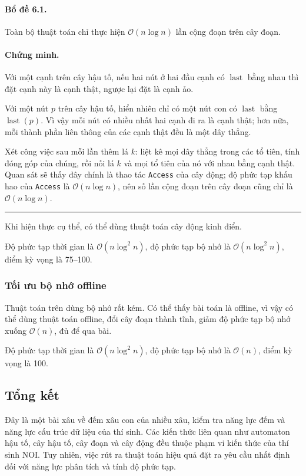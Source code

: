 \documentclass[11pt]{article}
\newcommand{\Oh}{\mathcal{O}}
\newcommand{\qedmark}{\hfill\rule{0.7ex}{0.7ex}}
\begin{document}
\paragraph{Bổ đề 6.1.}
Toàn bộ thuật toán chỉ thực hiện \(\Oh(n\log n)\) lần cộng đoạn trên cây đoạn.

\paragraph{Chứng minh.}
Với một cạnh trên cây hậu tố, nếu hai nút ở hai đầu cạnh có
\(\operatorname{last}\) bằng nhau thì đặt cạnh này là cạnh thật, ngược lại đặt
là cạnh ảo.

Với một nút \(p\) trên cây hậu tố, hiển nhiên chỉ có một nút con có
\(\operatorname{last}\) bằng \(\operatorname{last}(p)\). Vì vậy mỗi nút có nhiều
nhất hai cạnh đi ra là cạnh thật; hơn nữa, mỗi thành phần liên thông của các
cạnh thật đều là một dây thẳng.

Xét công việc sau mỗi lần thêm lá \(k\): liệt kê mọi dây thẳng trong các tổ
tiên, tính đóng góp của chúng, rồi nối lá \(k\) và mọi tổ tiên của nó với nhau
bằng cạnh thật. Quan sát sẽ thấy đây chính là thao tác \texttt{Access} của cây
động; độ phức tạp khấu hao của \texttt{Access} là \(\Oh(n\log n)\), nên số lần
cộng đoạn trên cây đoạn cũng chỉ là \(\Oh(n\log n)\). \qedmark

Khi hiện thực cụ thể, có thể dùng thuật toán cây động kinh điển.

Độ phức tạp thời gian là \(\Oh(n\log^2 n)\), độ phức tạp bộ nhớ là
\(\Oh(n\log^2 n)\), điểm kỳ vọng là 75--100.

\subsubsection{Tối ưu bộ nhớ offline}

Thuật toán trên dùng bộ nhớ rất kém. Có thể thấy bài toán là offline, vì vậy
có thể dùng thuật toán offline, đổi cây đoạn thành tĩnh, giảm độ phức tạp bộ
nhớ xuống \(\Oh(n)\), đủ để qua bài.

Độ phức tạp thời gian là \(\Oh(n\log^2 n)\), độ phức tạp bộ nhớ là \(\Oh(n)\),
điểm kỳ vọng là 100.

\subsection{Tổng kết}

Đây là một bài xâu về đếm xâu con của nhiều xâu, kiểm tra năng lực đếm và năng
lực cấu trúc dữ liệu của thí sinh. Các kiến thức liên quan như automaton hậu
tố, cây hậu tố, cây đoạn và cây động đều thuộc phạm vi kiến thức của thí sinh
NOI. Tuy nhiên, việc rút ra thuật toán hiệu quả đặt ra yêu cầu nhất định đối
với năng lực phân tích và tính độ phức tạp.
\end{document}
